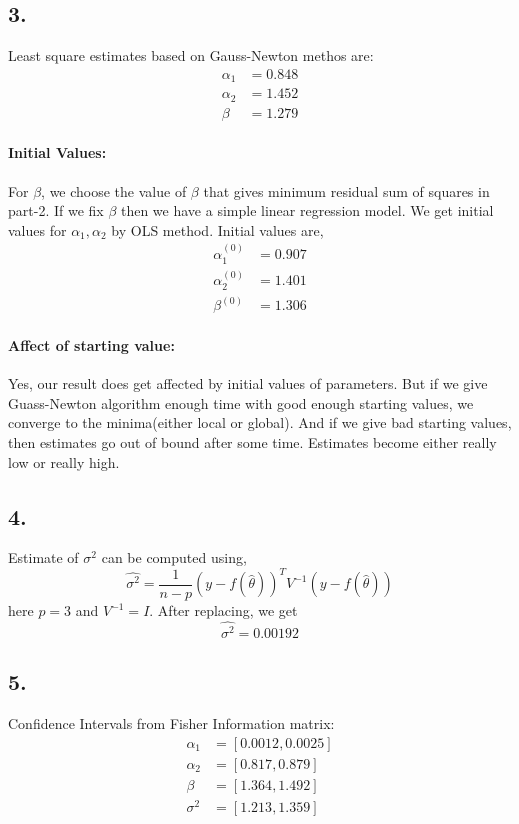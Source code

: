 \documentclass{article}
\begin{document}
\subsection*{3.}
Least square estimates based on Gauss-Newton methos are:
\begin{align*}
    \alpha_1&=0.848\\
    \alpha_2&=1.452\\
    \beta&=1.279
\end{align*}
\paragraph*{Initial Values:}For $\beta$, we choose the value of $\beta$ that gives minimum residual sum of squares in part-2. If we fix $\beta$ then we have a simple linear regression model. We get initial values for $\alpha_1, \alpha_2$ by OLS method. Initial values are,
\begin{align*}
    \alpha_1^{(0)}&=0.907\\
    \alpha_2^{(0)}&=1.401\\
    \beta^{(0)}&=1.306
\end{align*}
\paragraph*{Affect of starting value:}Yes, our result does get affected by initial values of parameters. But if we give Guass-Newton algorithm enough time with good enough starting values, we converge to the minima(either local or global). And if we give bad starting values, then estimates go out of bound after some time. Estimates become either really low or really high. 
\subsection*{4.}
Estimate of $\sigma^2$ can be computed using,
\begin{equation*}
    \hat{\sigma^2}=\frac{1}{n-p}(y-f(\hat{\theta}))^TV^{-1}(y-f(\hat{\theta}))
\end{equation*}
here $p=3$ and $V^{-1}=I$. After replacing, we get
\begin{equation*}
    \hat{\sigma^2}=0.00192
\end{equation*}
\subsection*{5.}
Confidence Intervals from Fisher Information matrix:
\begin{align*}
    \alpha_1&=[0.0012, 0.0025]\\
    \alpha_2&=[0.817, 0.879]\\
    \beta&=[1.364, 1.492]\\
    \sigma^2&=[1.213, 1.359]
\end{align*}
\end{document}
